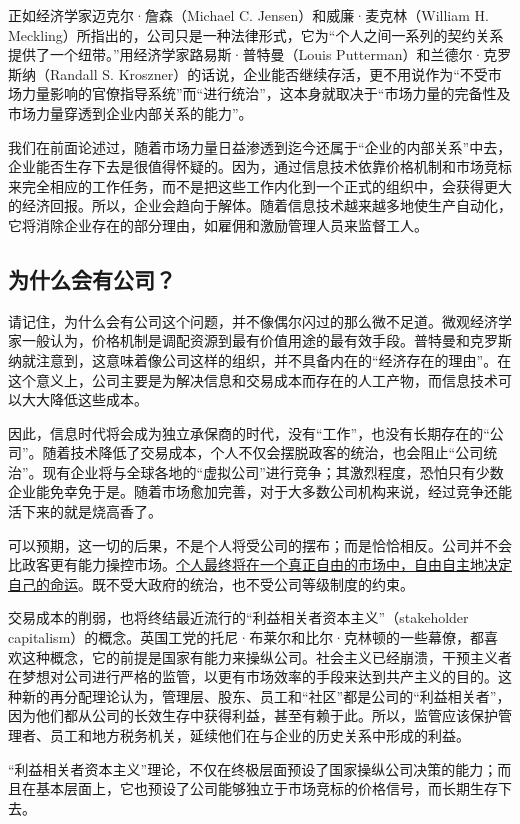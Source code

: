正如经济学家迈克尔·詹森（Michael C. Jensen）和威廉·麦克林（William H. Meckling）所指出的，公司只是一种法律形式，它为“个人之间一系列的契约关系提供了一个纽带。”用经济学家路易斯·普特曼（Louis Putterman）和兰德尔·克罗斯纳（Randall S. Kroszner）的话说，企业能否继续存活，更不用说作为“不受市场力量影响的官僚指导系统”而“进行统治”，这本身就取决于“市场力量的完备性及市场力量穿透到企业内部关系的能力”。

我们在前面论述过，随着市场力量日益渗透到迄今还属于“企业的内部关系”中去，企业能否生存下去是很值得怀疑的。因为，通过信息技术依靠价格机制和市场竞标来完全相应的工作任务，而不是把这些工作内化到一个正式的组织中，会获得更大的经济回报。所以，企业会趋向于解体。随着信息技术越来越多地使生产自动化，它将消除企业存在的部分理由，如雇佣和激励管理人员来监督工人。

\subsection{为什么会有公司？}
请记住，为什么会有公司这个问题，并不像偶尔闪过的那么微不足道。微观经济学家一般认为，价格机制是调配资源到最有价值用途的最有效手段。普特曼和克罗斯纳就注意到，这意味着像公司这样的组织，并不具备内在的“经济存在的理由”。在这个意义上，公司主要是为解决信息和交易成本而存在的人工产物，而信息技术可以大大降低这些成本。

因此，信息时代将会成为独立承保商的时代，没有“工作”，也没有长期存在的“公司”。随着技术降低了交易成本，个人不仅会摆脱政客的统治，也会阻止“公司统治”。现有企业将与全球各地的“虚拟公司”进行竞争；其激烈程度，恐怕只有少数企业能免幸免于是。随着市场愈加完善，对于大多数公司机构来说，经过竞争还能活下来的就是烧高香了。

可以预期，这一切的后果，不是个人将受公司的摆布；而是恰恰相反。公司并不会比政客更有能力操控市场。\uline{个人最终将在一个真正自由的市场中，自由自主地决定自己的命运}。既不受大政府的统治，也不受公司等级制度的约束。

交易成本的削弱，也将终结最近流行的“利益相关者资本主义”（stakeholder capitalism）的概念。英国工党的托尼·布莱尔和比尔·克林顿的一些幕僚，都喜欢这种概念，它的前提是国家有能力来操纵公司。社会主义已经崩溃，干预主义者在梦想对公司进行严格的监管，以更有市场效率的手段来达到共产主义的目的。这种新的再分配理论认为，管理层、股东、员工和“社区”都是公司的“利益相关者”，因为他们都从公司的长效生存中获得利益，甚至有赖于此。所以，监管应该保护管理者、员工和地方税务机关，延续他们在与企业的历史关系中形成的利益。

“利益相关者资本主义”理论，不仅在终极层面预设了国家操纵公司决策的能力；而且在基本层面上，它也预设了公司能够独立于市场竞标的价格信号，而长期生存下去。

